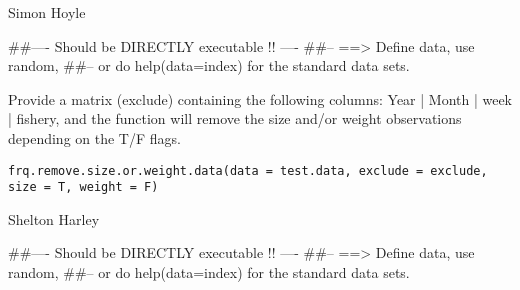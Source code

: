 \documentclass[a4paper]{book}
\begin{document}
%
\begin{Author}\relax

Simon Hoyle
\end{Author}
%
\begin{Examples}
\begin{ExampleCode}
##---- Should be DIRECTLY executable !! ----
##-- ==>  Define data, use random,
##--	or do  help(data=index)  for the standard data sets.

\end{ExampleCode}
\end{Examples}
%
\begin{Description}\relax

Provide a matrix (exclude) containing the following columns: Year | Month | week | fishery, and the function will remove the size and/or weight observations depending on the T/F flags. 
\end{Description}
%
\begin{Usage}
\begin{verbatim}
frq.remove.size.or.weight.data(data = test.data, exclude = exclude, size = T, weight = F)
\end{verbatim}
\end{Usage}
%
\begin{Arguments}
\begin{ldescription}
\item[\code{data}] 


\item[\code{exclude}] 


\item[\code{size}] 


\item[\code{weight}] 


\end{ldescription}
\end{Arguments}
%
\begin{Author}\relax

Shelton Harley
\end{Author}
%
\begin{Examples}
\begin{ExampleCode}
##---- Should be DIRECTLY executable !! ----
##-- ==>  Define data, use random,
##--	or do  help(data=index)  for the standard data sets.

\end{ExampleCode}
\end{Examples}
\end{document}
